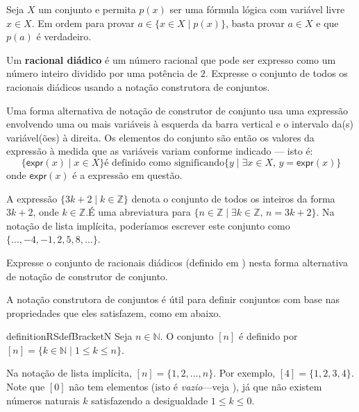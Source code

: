 \begin{strategy}
Seja $X$ um conjunto e permita $p(x)$ ser uma fórmula lógica com variável livre $x \in X$. Em ordem para provar $a \in \{ x \in X \mid p(x) \}$, basta provar
 $a \in X$ e que $p(a)$ é verdadeiro.
\end{strategy}

\begin{exercise}
\label{exDyadicRatioal}
Um \textbf{racional diádico} é um número racional que pode ser expresso como um número inteiro dividido por uma potência de $2$. Expresse o conjunto de todos os racionais diádicos usando a notação construtora de conjuntos.
\end{exercise}

Uma forma alternativa de notação de construtor de conjunto usa uma expressão envolvendo uma ou mais variáveis ​​à esquerda da barra vertical e o intervalo da(s) variável(ões) à direita. Os elementos do conjunto são então os valores da expressão à medida que as variáveis ​​variam conforme indicado --- isto é:
\[ \{ \mathsf{expr}(x) \mid x \in X \} \text{é definido como significando} \{ y \mid \exists x \in X,\, y = \mathsf{expr}(x) \} \]
onde $\mathsf{expr}(x)$ é a expressão em questão.

\begin{example}
A expressão $\{ 3k+2 \mid k \in \mathbb{Z} \}$ denota o conjunto de todos os inteiros da forma $3k+2$, onde $k \in \mathbb{Z}$.É uma abreviatura para $\{ n \in \mathbb{Z} \mid \exists k \in \mathbb{Z},\, n=3k+2 \}$. Na notação de lista implícita, poderíamos escrever este conjunto como $\{ \dots, {-4}, {-1}, 2, 5, 8, \dots \}$.
\end{example}

\begin{exercise}
Expresse o conjunto de racionais diádicos (definido em ) nesta forma alternativa de notação de construtor de conjunto.
\end{exercise}

A notação construtora de conjuntos é útil para definir conjuntos com base nas propriedades que eles satisfazem, como em  abaixo.

\begin{restatable}{definition}{RSdefBracketN}
\label{defBracketN}
Seja $n \in \mathbb{N}$. O conjunto $[n]$ é definido por $[n] = \{ k \in \mathbb{N} \mid 1 \le k \le n \}$.
\end{restatable}

\begin{example}
\label{exBracketN}
Na notação de lista implícita, $[n] = \{ 1, 2, \dots, n \}$. Por exemplo, $[4] = \{ 1, 2, 3, 4 \}$. Note que $[0]$ não tem elementos (isto é \textit{vazio}---veja ), já que não existem números naturais $k$ satisfazendo a desigualdade $1 \le k \le 0$.
\end{example}

